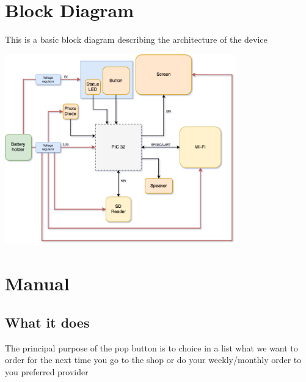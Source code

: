 \documentclass[
10pt,
a4paper,
]{article}
\begin{document}
\section{Block Diagram}
This is a basic block diagram describing the architecture of the device
\begin{center}
	\includegraphics[width=10cm]{block-diagram.png}
\end{center}

\section{Manual}
\subsection{What it does}
The principal purpose of the pop button is to choice in a list what we want to order for the next time you go to the shop or do your weekly/monthly order to you preferred provider
\end{document}
